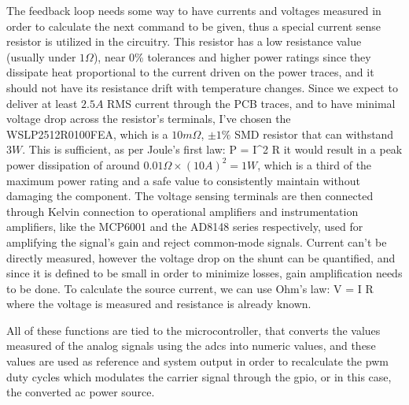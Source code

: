 The feedback loop needs some way to have currents and voltages measured in order to calculate the next command to be given, thus a special current sense resistor is utilized in the circuitry.
This resistor has a low resistance value (usually under $1\Omega$), near 0\% tolerances and higher power ratings since they dissipate heat proportional to the current driven on the power traces, and it should not have its resistance drift with temperature changes.
Since we expect to deliver at least $2.5A$ RMS current through the PCB traces, and to have minimal voltage drop across the resistor's terminals, I've chosen the WSLP2512R0100FEA, which is a $10m\Omega$, $\pm 1\%$ SMD resistor that can withstand $3W$.
This is sufficient, as per Joule's first law:
\be
\label{eq:Joulefirstlaw}
P = I^2 \times R
\ee
it would result in a peak power dissipation of around $0.01\Omega \times (10A)^2 = 1W$, which is a third of the maximum power rating and a safe value to consistently maintain without damaging the component.
The voltage sensing terminals are then connected through \gls{Kelvin connection} to operational amplifiers and instrumentation amplifiers, like the MCP6001 and the AD8148 series respectively, used for amplifying the signal's gain and reject common-mode signals.
Current can't be directly measured, however the voltage drop on the shunt can be quantified, and since it is defined to be small in order to minimize losses, gain amplification needs to be done. To calculate the source current, we can use Ohm's law:
\be
\label{eq:Ohmslaw}
V = I \times R
\ee
where the voltage is measured and resistance is already known.

All of these functions are tied to the microcontroller, that converts the values measured of the analog signals using the \gls{adc}s into numeric values, and these values are used as reference and system output in order to recalculate the \gls{pwm} duty cycles which modulates the carrier signal through the \gls{gpio}, or in this case, the converted \gls{ac} power source.